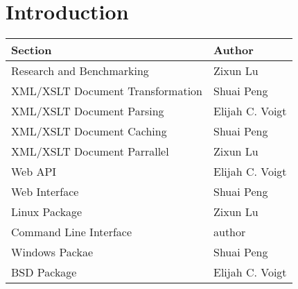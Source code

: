 \section{Introduction}

\begin{center}
    \begin{tabular}{ | l | p{10cm} |}
    \hline
    Section & Author \\ \hline
    Research and Benchmarking & Zixun Lu \\ \hline
    XML/XSLT Document Transformation & Shuai Peng \\ \hline
    XML/XSLT Document Parsing & Elijah C. Voigt \\ \hline
    XML/XSLT Document Caching & Shuai Peng \\ \hline
    XML/XSLT Document Parrallel & Zixun Lu \\ \hline
    Web API & Elijah C. Voigt\\ \hline
    Web Interface & Shuai Peng \\ \hline
    Linux Package & Zixun Lu\\ \hline
    Command Line Interface& author \\ \hline
    Windows Packae & Shuai Peng \\ \hline
    BSD Package & Elijah C. Voigt \\ \hline
    \end{tabular}
\end{center}

\tableofcontents

\newpage

\clearpage




\newpage
